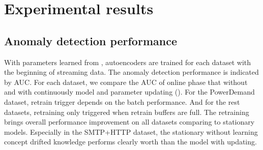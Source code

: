 \chapter{Experimental results}
\label{chap:results}


\section{Anomaly detection performance}
\label{sec:performance}

With parameters learned from , autoencoders are trained for each dataset with the beginning of streaming data. The anomaly detection performance is indicated by AUC. For each dataset, we compare the AUC of online phase that without and with continuously model and parameter updating (). For the PowerDemand dataset, retrain trigger depends on the batch performance. And for the rest datasets, retraining only triggered when retrain buffers are full. The retraining brings overall performance improvement on all datasets comparing to stationary models. Especially in the SMTP+HTTP dataset, the stationary without learning concept drifted knowledge performs clearly worth than the model with updating.\\

